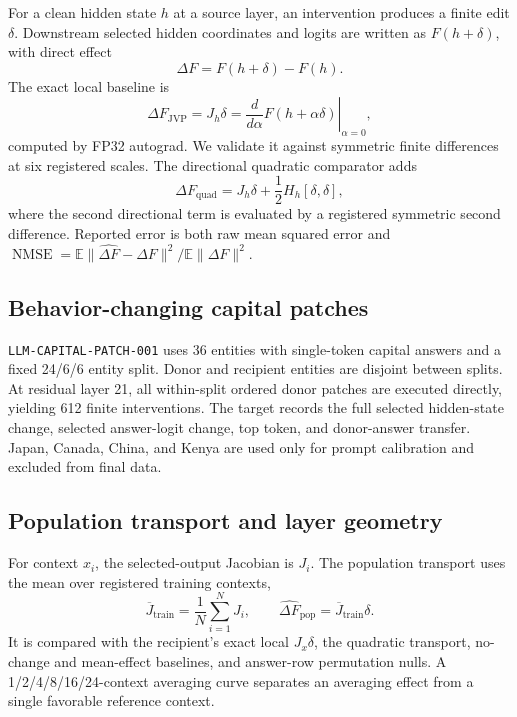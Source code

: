 \documentclass[10pt]{article}
\newcommand{\code}[1]{\texttt{#1}}
\newcommand{\nmse}{\operatorname{NMSE}}
\newcommand{\E}{\mathbb{E}}
\begin{document}
For a clean hidden state $h$ at a source layer, an intervention produces a
finite edit $\delta$.  Downstream selected hidden coordinates and logits are
written as $F(h+\delta)$, with direct effect
\begin{equation}
  \Delta F = F(h+\delta)-F(h).
\end{equation}
The exact local baseline is
\begin{equation}
  \Delta F_{\mathrm{JVP}} = J_h\delta
  = \left.\frac{d}{d\alpha}F(h+\alpha\delta)\right|_{\alpha=0},
\end{equation}
computed by FP32 autograd.  We validate it against symmetric finite
differences at six registered scales.  The directional quadratic comparator
adds
\begin{equation}
  \Delta F_{\mathrm{quad}}
  =J_h\delta + \frac{1}{2}H_h[\delta,\delta],
\end{equation}
where the second directional term is evaluated by a registered symmetric
second difference.  Reported error is both raw mean squared error and
$\nmse=\E\lVert\widehat{\Delta F}-\Delta F\rVert^2/
\E\lVert\Delta F\rVert^2$.

\subsection{Behavior-changing capital patches}

\code{LLM-CAPITAL-PATCH-001} uses 36 entities with single-token capital
answers and a fixed 24/6/6 entity split.  Donor and recipient entities are
disjoint between splits.  At residual layer 21, all within-split ordered donor
patches are executed directly, yielding 612 finite interventions.  The target
records the full selected hidden-state change, selected answer-logit change,
top token, and donor-answer transfer.  Japan, Canada, China, and Kenya are used
only for prompt calibration and excluded from final data.

\subsection{Population transport and layer geometry}

For context $x_i$, the selected-output Jacobian is $J_i$.  The population
transport uses the mean over registered training contexts,
\begin{equation}
  \overline{J}_{\mathrm{train}}=\frac{1}{N}\sum_{i=1}^N J_i,
  \qquad
  \widehat{\Delta F}_{\mathrm{pop}}=\overline{J}_{\mathrm{train}}\delta.
\end{equation}
It is compared with the recipient's exact local $J_x\delta$, the quadratic
transport, no-change and mean-effect baselines, and answer-row permutation
nulls.  A 1/2/4/8/16/24-context averaging curve separates an averaging effect
from a single favorable reference context.
\end{document}

